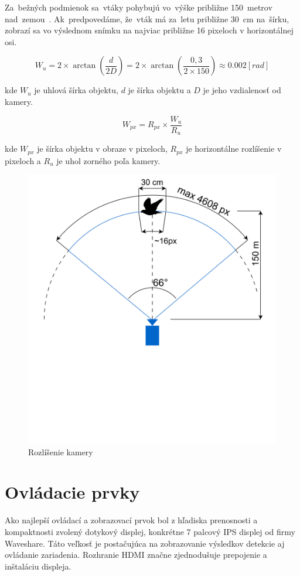         Za~bežných podmienok sa~vtáky pohybujú vo~výške približne 150~metrov nad~zemou~\cite{Wood2011}. Ak~predpovedáme, že~vták má za~letu približne 30~cm na~šírku, zobrazí sa vo výslednom snímku na najviac približne 16 pixeloch v horizontálnej osi.

        \begin{equation}
            W_{u} = 2 \times \arctan(\frac{d}{2D}) = 2 \times \arctan(\frac{0,3}{2 \times 150}) \approx 0.002 [rad]
        \end{equation}
        
        kde $W_{u}$ je uhlová šírka objektu, $d$ je šírka objektu a $D$ je jeho vzdialenosť od kamery.

        \begin{equation}
            W_{px} = R_{px} \times \frac{W_{u}}{R_{u}}
        \end{equation}

        kde $W_{px}$ je šírka objektu v obraze v pixeloch, $R_{px}$ je horizontálne rozlíšenie v pixeloch a $R_{u}$ je uhol zorného poľa kamery.

        \begin{figure}[h]
            \centering
            \includegraphics[width=.6\textwidth]{obrazky/camera/fov.drawio.png}
            \caption{Rozlíšenie kamery}
        \end{figure}

    \section{Ovládacie prvky}

        Ako najlepší ovládací a zobrazovací prvok bol z hľadiska prenosnosti a kompaktnosti zvolený dotykový displej, konkrétne 7 palcový IPS displej od firmy Waveshare. Táto veľkosť je postačujúca na zobrazovanie výsledkov detekcie aj ovládanie zariadenia. Rozhranie HDMI značne zjednodušuje prepojenie a inštaláciu displeja.

